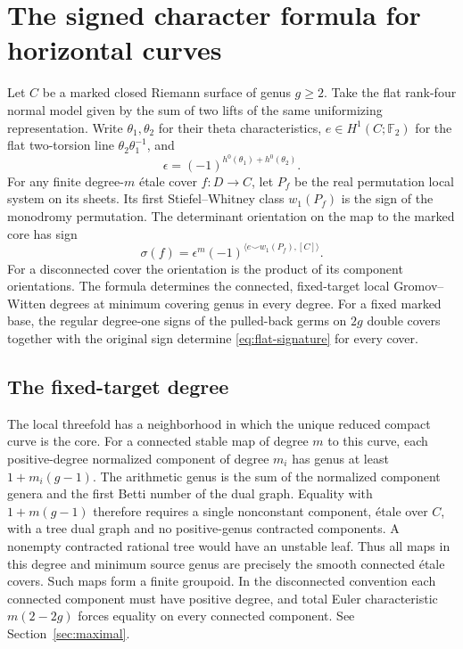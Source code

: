 \section{The signed character formula for horizontal curves}\label{sec:flat-sign}
Let \(C\) be a marked closed Riemann surface of genus \(g\ge2\). Take the flat rank-four normal model given by the sum of two lifts of the same uniformizing representation. Write \(\theta_1,\theta_2\) for their theta characteristics, \(e\in H^1(C;\mathbb F_2)\) for the flat two-torsion line \(\theta_2\theta_1^{-1}\), and
\[\epsilon=(-1)^{h^0(\theta_1)+h^0(\theta_2)}.\]
For any finite degree-\(m\) étale cover \(f:D\to C\), let \(P_f\) be the real permutation local system on its sheets. Its first Stiefel--Whitney class \(w_1(P_f)\) is the sign of the monodromy permutation. The determinant orientation on the map to the marked core has sign
\begin{equation}
\sigma(f)=\epsilon^m
     (-1)^{\langle e\smile w_1(P_f),[C]\rangle}.
 \label{eq:flat-signature}
\end{equation}
For a disconnected cover the orientation is the product of its component orientations. The formula determines the connected, fixed-target local Gromov--Witten degrees at minimum covering genus in every degree. For a fixed marked base, the regular degree-one signs of the pulled-back germs on \(2g\) double covers together with the original sign determine \eqref{eq:flat-signature} for every cover.

\subsection{The fixed-target degree}

The local threefold has a neighborhood in which the unique reduced compact curve is the core. For a connected stable map of degree \(m\) to this curve, each positive-degree normalized component of degree \(m_i\) has genus at least \(1+m_i(g-1)\). The arithmetic genus is the sum of the normalized component genera and the first Betti number of the dual graph. Equality with \(1+m(g-1)\) therefore requires a single nonconstant component, étale over \(C\), with a tree dual graph and no positive-genus contracted components. A nonempty contracted rational tree would have an unstable leaf. Thus all maps in this degree and minimum source genus are precisely the smooth connected étale covers. Such maps form a finite groupoid. In the disconnected convention each connected component must have positive degree, and total Euler characteristic \(m(2-2g)\) forces equality on every connected component. See Section~\ref{sec:maximal}.

